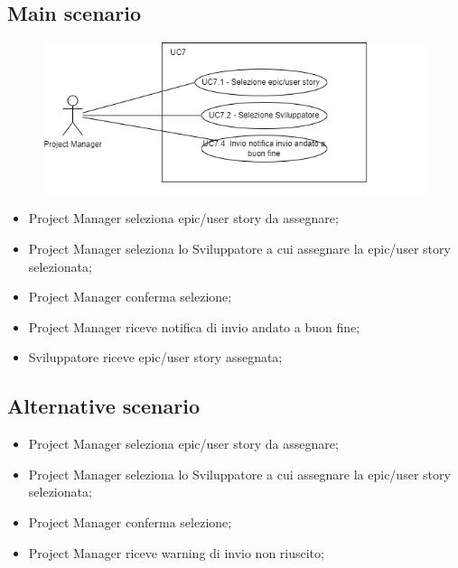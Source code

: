 \documentclass{article}
\begin{document}
    \subsection*{Main scenario}
        \begin{figure}[h]
          \centering
          \includegraphics{./imgUML/UC7-zoom.png}
          \label{fig:immagine}
        \end{figure}
        
        \begin{itemize}
            \item Project Manager seleziona epic/user story da assegnare;
            \item Project Manager seleziona lo Sviluppatore a cui assegnare la epic/user story selezionata;
            \item Project Manager conferma selezione;
            \item Project Manager riceve notifica di invio andato a buon fine;
            \item Sviluppatore riceve epic/user story assegnata;
        \end{itemize}
        
    \subsection*{Alternative scenario}
        \begin{itemize}
            \item Project Manager seleziona epic/user story da assegnare;
            \item Project Manager seleziona lo Sviluppatore a cui assegnare la epic/user story selezionata;
            \item Project Manager conferma selezione;
            \item Project Manager riceve warning di invio non riuscito;
        \end{itemize}    
\end{document}
